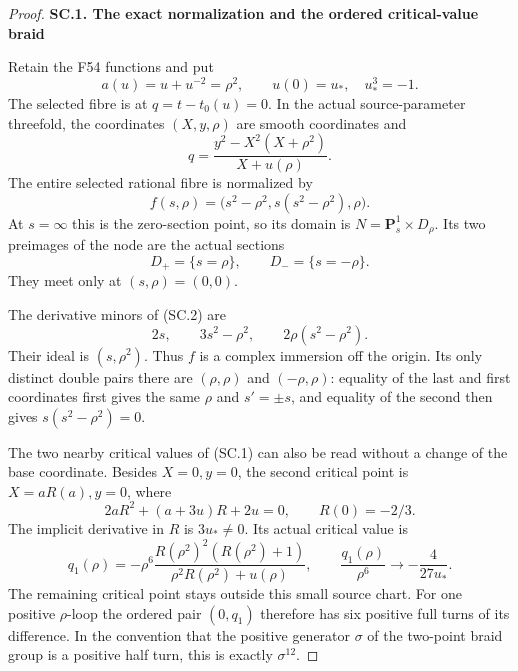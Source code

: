 \begin{proof}
\par

\medskip\noindent\textbf{SC.1. The exact normalization and the ordered critical-value braid}

\par\nobreak

Retain the F54 functions and put
\[
 a(u)=u+u^{-2}=\rho^2,\qquad u(0)=u_*,\quad u_*^3=-1.
\]
The selected fibre is at \(q=t-t_0(u)=0\). In the actual source-parameter
threefold, the coordinates \((X,y,\rho)\) are smooth coordinates and
\[
 q=\frac{y^2-X^2(X+\rho^2)}{X+u(\rho)}.                 \tag{SC.1}
\]
The entire selected rational fibre is normalized by
\[
 f(s,\rho)=\bigl(s^2-\rho^2,
                    s(s^2-\rho^2),\rho\bigr).         \tag{SC.2}
\]
At \(s=\infty\) this is the zero-section point, so its domain is
\(N=\mathbf P^1_s\times D_\rho\). Its two preimages of the node are
the actual sections
\[
 D_+=\{s=\rho\},\qquad D_-=\{s=-\rho\}.              \tag{SC.3}
\]
They meet only at \((s,\rho)=(0,0)\).

The derivative minors of (SC.2) are
\[
 2s,\qquad 3s^2-\rho^2,\qquad
                      2\rho(s^2-\rho^2).
\]
Their ideal is \((s,\rho^2)\). Thus \(f\) is a complex immersion off
the origin. Its only distinct double pairs there are
\((\rho,\rho)\) and \((-\rho,\rho)\): equality of the last and first
coordinates first gives the same \(\rho\) and \(s'=\pm s\), and equality
of the second then gives \(s(s^2-\rho^2)=0\).

The two nearby critical values of (SC.1) can also be read without a
change of the base coordinate. Besides \(X=0,y=0\), the second critical
point is \(X=aR(a),y=0\), where
\[
 2aR^2+(a+3u)R+2u=0,\qquad R(0)=-2/3.
\]
The implicit derivative in \(R\) is \(3u_*\ne0\). Its actual critical
value is
\[
 q_1(\rho)
   =-\rho^6\frac{R(\rho^2)^2(R(\rho^2)+1)}
                    {\rho^2R(\rho^2)+u(\rho)},\qquad
 \frac{q_1(\rho)}{\rho^6}\longrightarrow-\frac4{27u_*}.
                                                               \tag{SC.4}
\]
The remaining critical point stays outside this small source chart.
For one positive \(\rho\)-loop the ordered pair \((0,q_1)\) therefore
has six positive full turns of its difference. In the convention that
the positive generator \(\sigma\) of the two-point braid group is a
positive half turn, this is exactly \(\sigma^{12}\).


\end{proof}

